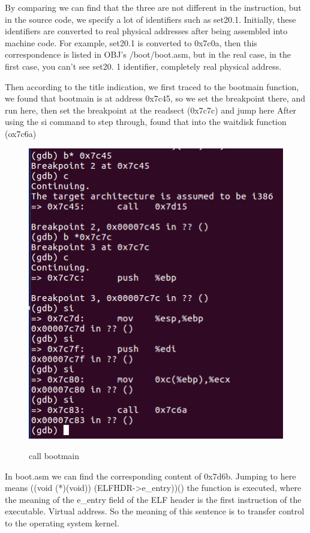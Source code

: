 By comparing we can find that the three are not different in the instruction, but in the source code, we specify a lot of identifiers such as set20.1. Initially, these identifiers are converted to real physical addresses after being assembled into machine code. For example, set20.1 is converted to 0x7c0a, then this correspondence is listed in OBJ's /boot/boot.asm, but in the real case, in the first case, you can't see set20. 1 identifier, completely real physical address.


Then according to the title indication, we first traced to the bootmain function, we found that bootmain is at address 0x7c45, so we set the breakpoint there, and run here, then set the breakpoint at the readsect (0x7c7c) and jump here After using the si command to step through, found that into the waitdisk function (ox7c6a)
\begin{figure}[H]
  \centering
  \includegraphics[width=0.8\linewidth]{figure/to_wait_disk}\\
  \caption{call bootmain}\label{2}
\end{figure}
In boot.asm we can find the corresponding content of 0x7d6b. Jumping to here means ((void (*)(void)) (ELFHDR->e\_entry))() the function is executed, where the meaning of the e\_entry field of the ELF header is the first instruction of the executable. Virtual address. So the meaning of this sentence is to transfer control to the operating system kernel.
